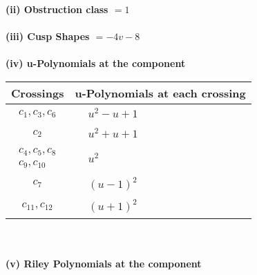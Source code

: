 \documentclass[1p]{elsarticle_modified}
\theoremstyle{definition}
\begin{document}
\flushleft \textbf{(ii) Obstruction class $= 1$}\\~\\
\flushleft \textbf{(iii) Cusp Shapes $= -4 v-8$}\\~\\
\newpage\renewcommand{\arraystretch}{1}
\flushleft \textbf{(iv) u-Polynomials at the component}\newline \\
\begin{tabular}{m{50pt}|m{274pt}}
Crossings & \hspace{64pt}u-Polynomials at each crossing \\
\hline $$\begin{aligned}c_{1},c_{3},c_{6}\end{aligned}$$&$\begin{aligned}
&u^2- u+1
\end{aligned}$\\
\hline $$\begin{aligned}c_{2}\end{aligned}$$&$\begin{aligned}
&u^2+u+1
\end{aligned}$\\
\hline $$\begin{aligned}c_{4},c_{5},c_{8}\\c_{9},c_{10}\end{aligned}$$&$\begin{aligned}
&u^2
\end{aligned}$\\
\hline $$\begin{aligned}c_{7}\end{aligned}$$&$\begin{aligned}
&(u-1)^2
\end{aligned}$\\
\hline $$\begin{aligned}c_{11},c_{12}\end{aligned}$$&$\begin{aligned}
&(u+1)^2
\end{aligned}$\\
\hline
\end{tabular}\\~\\
\newpage\renewcommand{\arraystretch}{1}
\flushleft \textbf{(v) Riley Polynomials at the component}\newline \\
\end{document}
